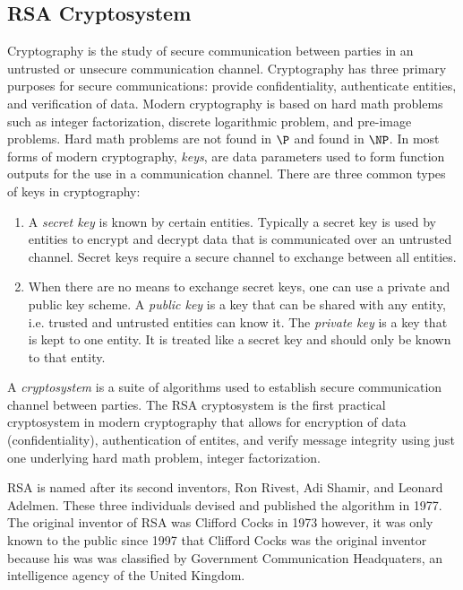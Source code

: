 \documentclass[10pt]{CSUNthesis}
\theoremstyle{plain}%
\theoremstyle{definition}
\theoremstyle{remark}
\begin{document}
\subsection{RSA Cryptosystem}
Cryptography is the study of secure communication between parties in an untrusted or unsecure communication channel.
Cryptography has three primary purposes for secure communications: provide confidentiality, authenticate entities, and verification of data.
Modern cryptography is based on hard math problems such as integer factorization, discrete logarithmic problem, and pre-image problems. 
Hard math problems are not found in $\P$ and found in $\NP$.
In most forms of modern cryptography, \textit{keys}, are data parameters used to form function outputs for the use in a communication channel.
There are three common types of keys in cryptography:
\begin{enumerate}
\item A \textit{secret key} is known by certain entities.  Typically a secret key is used by entities to encrypt and decrypt data that is communicated over an untrusted channel.  Secret keys require a secure channel to exchange between all entities.
\item When there are no means to exchange secret keys, one can use a private and public key scheme.
A \textit{public key} is a key that can be shared with any entity, i.e. trusted and untrusted entities can know it.
The \textit{private key} is a key that is kept to one entity. It is treated like a secret key and should only be known to that entity.
\end{enumerate}
A \textit{cryptosystem} is a suite of algorithms used to establish secure communication channel between parties. 
The RSA cryptosystem is the first practical cryptosystem in modern cryptography that allows for encryption of data (confidentiality), authentication of entites, and verify message integrity using just one underlying hard math problem, integer factorization.

RSA is named after its second inventors, Ron Rivest, Adi Shamir, and Leonard Adelmen.
These three individuals devised and published the algorithm in 1977.
The original inventor of RSA was Clifford Cocks in 1973 however, it was only known to the public since 1997 that Clifford Cocks was the original inventor because his was was classified by Government Communication Headquaters, an intelligence agency of the United Kingdom.
\end{document}
